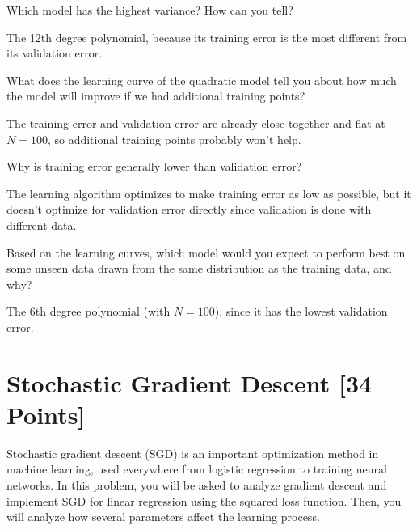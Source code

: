 \begin{problem}[3]
  Which model has the highest variance? How can you tell?
\end{problem}
\begin{solution}
  The 12th degree polynomial, because its training error is the most different from its validation error.
\end{solution}

\begin{problem}[3]
  What does the learning curve of the quadratic model tell you about how much the model will improve if we had additional training points?
\end{problem}
\begin{solution}
  The training error and validation error are already close together and flat at $N = 100$, so additional training points probably won't help.
\end{solution}

\begin{problem}[3]
  Why is training error generally lower than validation error?
\end{problem}
\begin{solution}
  The learning algorithm optimizes to make training error as low as possible, but it doesn't optimize for validation error directly since validation is done with different data.
\end{solution}

\begin{problem}[3]
  Based on the learning curves, which model would you expect to perform best on some unseen data drawn from the same distribution as the training data, and why?
\end{problem}
\begin{solution}
  The 6th degree polynomial (with $N = 100$), since it has the lowest validation error.
\end{solution}





\newpage
\section{Stochastic Gradient Descent [34 Points]}

Stochastic gradient descent (SGD) is an important optimization method in machine learning, used everywhere from logistic regression to training neural networks. In this problem, you will be asked to analyze gradient descent and implement SGD for linear regression using the squared loss function. Then, you will analyze how several parameters affect the learning process.

